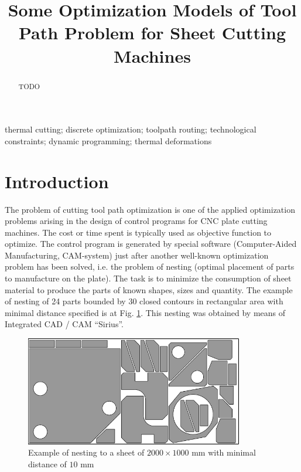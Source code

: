 \documentclass{../download/tPRS2e}
\begin{document}
\title{Some Optimization Models of Tool Path Problem for Sheet Cutting Machines}

\author{
}

\maketitle

\begin{abstract}
TODO
\end{abstract}

\begin{keywords}
    thermal cutting;
    discrete optimization;
    toolpath routing;
    technological constraints;
    dynamic programming;
    thermal deformations
\end{keywords}

\section{Introduction}

The problem of cutting tool path optimization
is one of the applied optimization problems arising
in the design of control programs for CNC plate cutting machines.
The cost or time spent is typically used
as objective function to optimize.
The control program is generated by special software 
(Computer-Aided Manufacturing, CAM-system)
just after another well-known optimization problem
has been solved,
i.e. the problem of nesting
(optimal placement of parts to manufacture on the plate).
The task is to minimize the consumption of sheet material
to produce the parts of known shapes, sizes and quantity.
The example of nesting of 24 parts bounded by 30 closed contours
in rectangular area with minimal distance specified is at Fig. \ref{nesting}.
This nesting was obtained by means of Integrated CAD / CAM ``Sirius''.

\begin{figure}[]
    \begin{center}
    \includegraphics[width=0.85\textwidth]{nesting.png}
    \caption{Example of nesting to a sheet of $2000 \times 1000$ mm
    with minimal distance of $10$ mm} \label{nesting}
    \end{center}
\end{figure}
\end{document}
